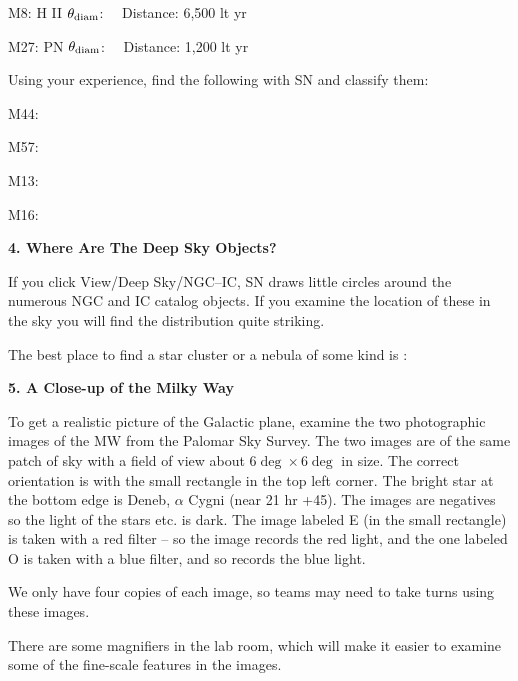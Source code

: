 \bigskip
\noindent
{\framebox[3.0cm]{\rule[-1.5cm]{0cm}{3cm}\,} \hspace{0.5cm}
M8: H II \hfill $\theta_{\rm diam}$: \makebox[3cm]{\hrulefill} \ \ 
Distance: 6,500 lt yr}

\bigskip
\noindent
{\framebox[3.0cm]{\rule[-1.5cm]{0cm}{3cm}\,} \hspace{0.5cm}
M27: PN \hfill $\theta_{\rm diam}$: \makebox[3cm]{\hrulefill} \ \ 
Distance: 1,200 lt yr}

\bigskip
\bigskip
\noindent
Using your experience, find the following with SN and classify them:

\medskip
M44: \makebox[3cm]{\hrulefill} 

\medskip
M57: \makebox[3cm]{\hrulefill}

\medskip
M13: \makebox[3cm]{\hrulefill}

\medskip
M16: \makebox[3cm]{\hrulefill}

\vspace{.3cm}
\bigskip


\clearpage
\noindent
{\bf 4. Where Are The Deep Sky Objects?}

\medskip
\noindent
If you click  View/Deep Sky/NGC--IC, SN draws little circles around
the numerous NGC and IC catalog objects. If you examine the location
of these in the sky you will find the distribution quite striking. 

\bigskip
\noindent
The best place to find a star cluster or a nebula of some kind is : 
\makebox[3cm]{\hrulefill}


\bigskip
\medskip
\noindent

\noindent
{\bf 5. A Close-up of the Milky Way}

\medskip
\noindent
To get a realistic picture of the Galactic plane, examine the two
photographic images of the MW from the Palomar Sky Survey. The two
images are of the same patch of sky with a field of view about $6\deg
\times 6\deg$ in size.  The correct orientation is with the small
rectangle in the top left corner. The bright star at the bottom edge
is Deneb, $\alpha$ Cygni (near 21 hr +45\deg).  The images are
negatives so the light of the stars etc. is dark. The image labeled E
(in the small rectangle) is taken with a red filter -- so the image
records the red light, and the one labeled O is taken with a blue
filter, and so records the blue light.

\noindent We only have four copies of each image, so teams may need to
take turns using these images.

\noindent There are some magnifiers in the lab room, which will make
it easier to examine some of the fine-scale features in the images. 

